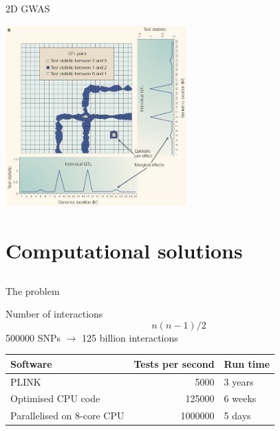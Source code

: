 \documentclass{beamer}
\begin{document}
\begin{frame}{2D GWAS}
	\begin{center}
		\includegraphics[height=7cm]{2dscan.png}
	\end{center}
\end{frame}




\section{Computational solutions}
\subsection{}




\begin{frame}{The problem}
	\begin{block}{Number of interactions}
		\begin{equation}
			n(n-1) / 2 \nonumber
		\end{equation}
		500000 SNPs $\rightarrow$ 125 billion interactions
	\end{block}

	\begin{table}[ht]
		\begin{center}
			\begin{tabular}{lrl}
				\hline
				Software & Tests per second & Run time \\ 
				\hline
				PLINK & 5000 & 3 years \\ 
				Optimised CPU code & 125000 & 6 weeks \\ 
				Parallelised on 8-core CPU & 1000000 & 5 days \\ 
			   \hline
			\end{tabular}
		\end{center}
	\end{table}
\end{frame}
\end{document}
